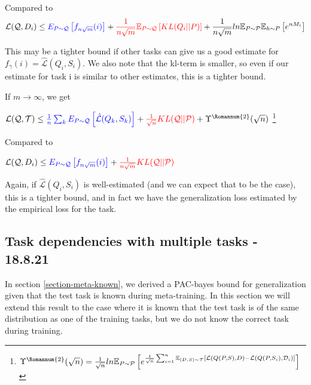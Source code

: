 \documentclass[letterpaper]{article}
\theoremstyle{definition}
\begin{document}
Compared to 
\begin{equation*}
\begin{split}
\mathcal{L}(\mathcal{Q}, D_i)\leq \textcolor{blue}{E_{P\sim \mathcal{Q}}  \left [ f_{n\sqrt{m}}(i) \right ]}  + \textcolor{red}{\frac{1}{n\sqrt{m}}\mathbb{E}_{P\sim \mathcal{Q}} \left [KL(Q_i||P)\right ]} + \frac{1}{n\sqrt{m}} ln\mathbb{E}_{P\sim \mathcal{P}}\mathbb{E}_{h\sim P}\left [ e^{nM_i}\right ]  
\end{split}
\end{equation*}
 
This may be a tighter bound if other tasks can give us a good estimate for $f_{\gamma}(i)=\hat{\mathcal{L}}(Q_i,S_i)$. We also note that the kl-term is smaller, so even if our estimate for task i is similar to other estimates, this is a tighter bound.

If $m\rightarrow\infty$, we get

$\mathcal{L}(\mathcal{Q}, \mathcal{T}) \leq \textcolor{blue}{\frac{1}{n}\sum_k E_{P\sim \mathcal{Q}} \left [ \hat{\mathcal{L}}(Q_k,S_k) \right ]}+ \textcolor{red}{\frac{1}{\sqrt{n}}KL(\mathcal{Q}||\mathcal{P})} + \Upsilon^{\text{\Romannum{2}}}(\sqrt{n})$ 
\footnote{$\Upsilon^{\text{\Romannum{2}}}(\sqrt{n})=\frac{1}{\sqrt{n}}ln \mathbb{E}_{P\sim \mathcal{P}} \left [e^{\frac{1}{\sqrt{n}}\sum_{i=1}^{n}\mathbb{E}_{(D,S)\sim \mathcal{T}}\left [\mathcal{L}(Q(P,S),D)- \mathcal{L}(Q(P, S_i), \mathcal{D}_i)\right ]} \right ]$}

Compared to 

$\mathcal{L}(\mathcal{Q}, D_i)\leq \textcolor{blue}{E_{P\sim \mathcal{Q}}  \left [ f_{n\sqrt{m}}(i)\right ]} + \textcolor{red}{\frac{1}{n\sqrt{m}}KL(\mathcal{Q}||\mathcal{P})} $

Again, if $\hat{\mathcal{L}}(Q_i,S_i)$ is well-estimated (and we can expect that to be the case), this is a tighter bound, and in fact we have the generalization loss estimated by the empirical loss for the task.


\subsection{Task dependencies with multiple tasks - 18.8.21}

In section \ref{section-meta-known}, we derived a PAC-bayes bound for generalization given that the test task is known during meta-training. In this section we will extend this result to the case where it is known that the test task is of the same distribution as one of the training tasks, but we do not know the correct task during training.
\end{document}
